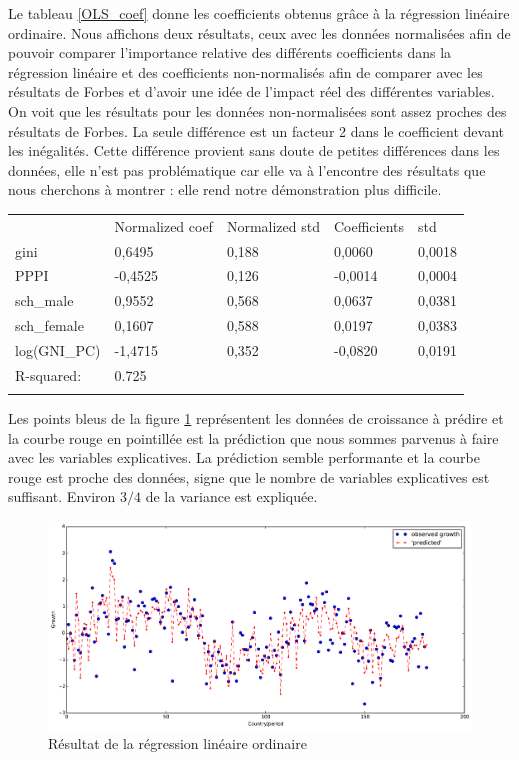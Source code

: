 \documentclass[11pt,a4paper]{article}
\begin{document}
Le tableau \ref{OLS_coef} donne les coefficients obtenus grâce à la régression linéaire ordinaire. Nous affichons deux résultats, ceux avec les données normalisées afin de pouvoir comparer l'importance relative des différents coefficients dans la régression linéaire et des coefficients non-normalisés afin de comparer avec les résultats de Forbes et d'avoir une idée de l'impact réel des différentes variables. On voit que les résultats pour les données non-normalisées sont assez proches des résultats de Forbes. La seule différence est un facteur 2 dans le coefficient devant les inégalités. Cette différence provient sans doute de petites différences dans les données, elle n'est pas problématique car elle va à l'encontre des résultats que nous cherchons à montrer : elle rend notre démonstration plus difficile. 


\begin{center}
\begin{tabular}{ l ll | ll }
 & Normalized coef & Normalized std & Coefficients & std\\
gini      &  0,6495  &  0,188  &  0,0060  &  0,0018  \\ 
PPPI       &  -0,4525  &  0,126  &  -0,0014  &  0,0004  \\ 
sch_male    &    0,9552  &  0,568  &  0,0637  &  0,0381  \\ 
sch_female   &   0,1607  &  0,588  &  0,0197  &  0,0383  \\ 
log(GNI_PC)  & -1,4715 &  0,352  &  -0,0820  &  0,0191 \\
R-squared:      &                 0.725 \\
\label{OLS_coef}
\end{tabular}
\end{center}


Les points bleus de la figure \ref{OLS_graph} représentent les données de croissance à prédire et la courbe rouge en pointillée est la prédiction que nous sommes parvenus à faire avec les variables explicatives. La prédiction semble performante et la courbe rouge est proche des données, signe que le nombre de variables explicatives est suffisant. Environ $3/4$ de la variance est expliquée. 

\begin{figure}
  \centering
  \includegraphics[width=1.\linewidth]{OLS_results.pdf}
\caption{Résultat de la régression linéaire ordinaire}
\label{OLS_graph}
\end{figure}
\end{document}

